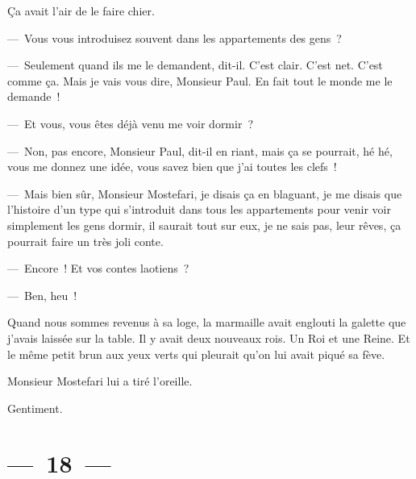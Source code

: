\documentclass[french,twoside]{book} %
\begin{document}
Ça avait l’air de le faire chier.\par
— Vous vous introduisez souvent dans les appartements des gens ?\par
— Seulement quand ils me le demandent, dit-il. C’est clair. C’est net. C’est comme ça. Mais je vais vous dire, Monsieur Paul. En fait tout le monde me le demande !\par
— Et vous, vous êtes déjà venu me voir dormir ?\par
— Non, pas encore, Monsieur Paul, dit-il en riant, mais ça se pourrait, hé hé, vous me donnez une idée, vous savez bien que j’ai toutes les clefs !\par
— Mais bien sûr, Monsieur Mostefari, je disais ça en blaguant, je me disais que l’histoire d’un type qui s’introduit dans tous les appartements pour venir voir simplement les gens dormir, il saurait tout sur eux, je ne sais pas, leur rêves, ça pourrait faire un très joli conte.\par
— Encore ! Et vos contes laotiens ?\par
— Ben, heu !\par
Quand nous sommes revenus à sa loge, la marmaille avait englouti la galette que j’avais laissée sur la table. Il y avait deux nouveaux rois. Un Roi et une Reine. Et le même petit brun aux yeux verts qui pleurait qu’on lui avait piqué sa fève.\par
Monsieur Mostefari lui a tiré l’oreille.\par
Gentiment.

\section[{— 18 —}]{— 18 —}
\renewcommand{\leftmark}{— 18 —}
\end{document}
